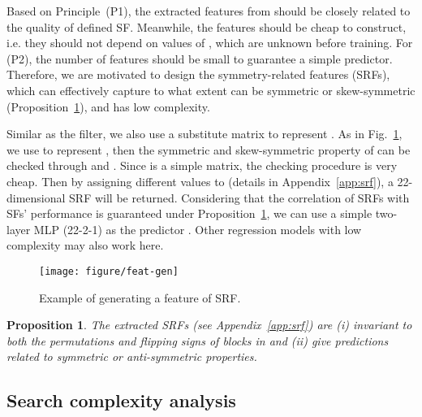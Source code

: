 \documentclass[conference]{IEEEtran}
\newtheorem{prop}{Proposition}
\begin{document}
Based on Principle~(P1),
the extracted features from  should be closely related to the quality of defined SF.
Meanwhile, the features should be cheap to construct,
i.e. they should not depend on values of ,
which are unknown before training.
For (P2), the number of features should be small to guarantee a simple predictor.
Therefore, we are motivated to design the
symmetry-related features (SRFs),
which can effectively capture to what extent  can be symmetric or skew-symmetric (Proposition~\ref{pr:srfs}),
and has low complexity.



Similar as the filter, we also use a  substitute matrix to represent .
As in Fig.~\ref{fig:feat-gen},
we use  to represent ,
then the symmetric and skew-symmetric property of  can be checked through
 and .
Since  is a simple  matrix, the checking procedure is very cheap.
Then by assigning different values to  (details in Appendix~\ref{app:srf}),
a 22-dimensional SRF will be returned.
Considering that the correlation of SRFs with SFs' performance is guaranteed under Proposition~\ref{pr:srfs},
we can use a simple two-layer MLP (22-2-1) as the predictor .
Other regression models with low complexity may also work here.




\begin{figure}[ht]
	\centering
	\vspace{-5px}
	\texttt{[image: figure/feat-gen]}
	\vspace{-20px}
	\caption{Example of generating a feature of SRF.}
	\vspace{-10px}
	\label{fig:feat-gen}
\end{figure}

\begin{prop} 
	\label{pr:srfs}
	The extracted SRFs (see Appendix~\ref{app:srf})
	are (i) invariant to both the permutations and flipping signs of blocks in  
	and 
	(ii) give predictions related to symmetric or anti-symmetric properties.
\end{prop}


\subsection{Search complexity analysis}
\label{ssec:complexity}
\end{document}

